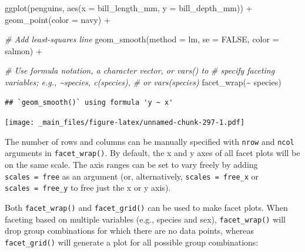 \documentclass[
]{book}
\newenvironment{Shaded}{\begin{snugshade}}{\end{snugshade}}
\newcommand{\AttributeTok}[1]{\textcolor[rgb]{0.77,0.63,0.00}{#1}}
\newcommand{\CommentTok}[1]{\textcolor[rgb]{0.56,0.35,0.01}{\textit{#1}}}
\newcommand{\ConstantTok}[1]{\textcolor[rgb]{0.00,0.00,0.00}{#1}}
\newcommand{\FunctionTok}[1]{\textcolor[rgb]{0.00,0.00,0.00}{#1}}
\newcommand{\NormalTok}[1]{#1}
\newcommand{\SpecialCharTok}[1]{\textcolor[rgb]{0.00,0.00,0.00}{#1}}
\newcommand{\StringTok}[1]{\textcolor[rgb]{0.31,0.60,0.02}{#1}}
\begin{document}
\begin{Shaded}
\begin{Highlighting}[]
\FunctionTok{ggplot}\NormalTok{(penguins, }\FunctionTok{aes}\NormalTok{(}\AttributeTok{x =}\NormalTok{ bill\_length\_mm, }\AttributeTok{y =}\NormalTok{ bill\_depth\_mm)) }\SpecialCharTok{+}
  \FunctionTok{geom\_point}\NormalTok{(}\AttributeTok{color =} \StringTok{\textquotesingle{}navy\textquotesingle{}}\NormalTok{) }\SpecialCharTok{+}
  
  \CommentTok{\# Add least{-}squares line}
  \FunctionTok{geom\_smooth}\NormalTok{(}\AttributeTok{method =} \StringTok{\textquotesingle{}lm\textquotesingle{}}\NormalTok{, }\AttributeTok{se =} \ConstantTok{FALSE}\NormalTok{, }\AttributeTok{color =} \StringTok{\textquotesingle{}salmon\textquotesingle{}}\NormalTok{) }\SpecialCharTok{+} 
  
  \CommentTok{\# Use formula notation, a character vector, or vars() to }
  \CommentTok{\# specify faceting variables; e.g., \textasciitilde{}species, c(\textquotesingle{}species\textquotesingle{}), }
  \CommentTok{\# or vars(species)}
  \FunctionTok{facet\_wrap}\NormalTok{(}\SpecialCharTok{\textasciitilde{}}\NormalTok{ species)}
\end{Highlighting}
\end{Shaded}

\begin{verbatim}
## `geom_smooth()` using formula 'y ~ x'
\end{verbatim}

\texttt{[image: \_main\_files/figure-latex/unnamed-chunk-297-1.pdf]}

The number of rows and columns can be manually specified with \texttt{nrow} and \texttt{ncol} arguments in \texttt{facet\_wrap()}. By default, the x and y axes of all facet plots will be on the same scale. The axis ranges can be set to vary freely by adding \texttt{scales\ =\ \textquotesingle{}free\textquotesingle{}} as an argument (or, alternatively, \texttt{scales\ =\ \textquotesingle{}free\_x\textquotesingle{}} or \texttt{scales\ =\ \textquotesingle{}free\_y\textquotesingle{}} to free just the x or y axis).

Both \texttt{facet\_wrap()} and \texttt{facet\_grid()} can be used to make facet plots. When faceting based on multiple variables (e.g., species and sex), \texttt{facet\_wrap()} will drop group combinations for which there are no data points, whereas \texttt{facet\_grid()} will generate a plot for all possible group combinations:
\end{document}
